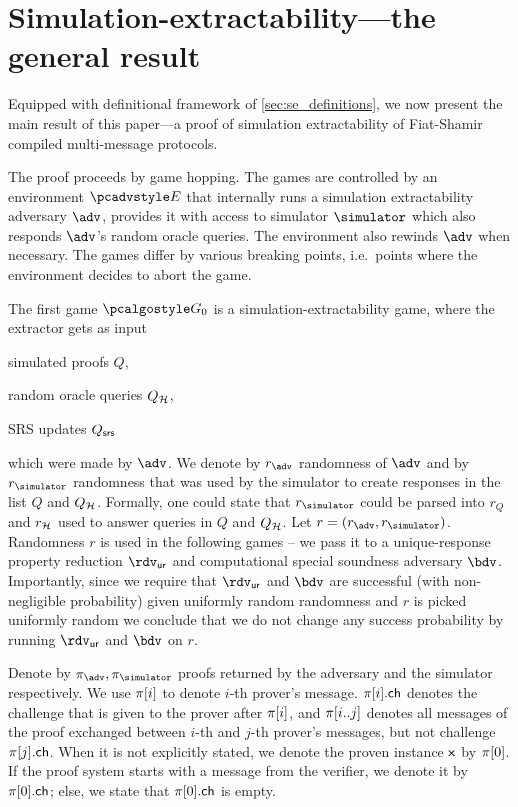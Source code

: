 \section{Simulation-extractability---the general result}
\label{sec:general}
Equipped with definitional framework of \cref{sec:se_definitions}, we now present the
main result of this paper---a proof of simulation extractability of
Fiat-Shamir compiled multi-message protocols.

The proof proceeds by game hopping. The games are controlled by an environment $\env$ that
internally runs a simulation extractability adversary $\advse$, provides it with access to
simulator $\simulator$ which also responds $\adv$'s random oracle queries. The environment
also rewinds $\adv$ when necessary. The games differ by various breaking points,
i.e.~points where the environment decides to abort the game.

The first game $\game{0}$ is a simulation-extractability game, where the extractor
gets as input
\begin{inparaenum}[(1)]
\item simulated proofs $Q$,
\item random oracle queries $Q_{\mathcal{H}}$,
\item SRS updates $Q_{\mathsf{srs}}$
\end{inparaenum}
which were made by $\advse$.  We denote by $\radv$ randomness of $\advse$ and by
$\rsim$ randomness that was used by the simulator to create responses in the list $Q$
and $Q_{\mathcal{H}}$. Formally, one could state that $\rsim$ could be parsed into $r_Q$ and
$r_{\mathcal{H}}$ used to answer queries in $Q$ and $Q_{\mathcal{H}}$. Let $r = (\radv,
\rsim)$. Randomness $r$ is used in the following games -- we pass it to a
unique-response property reduction $\rdvur$ and computational special soundness adversary
$\bdv$. Importantly, since we require that $\rdvur$ and $\bdv$ are successful (with
non-negligible probability) given uniformly random randomness and $r$ is picked
uniformly random we conclude that we do not change any success probability by running
$\rdvur$ and $\bdv$ on $r$. 

Denote by $\zkproof_{\advse}, \zkproof_{\simulator}$ proofs returned by the adversary
and the simulator respectively. We use $\pi[i]$ to denote $i$-th prover's
message. $\pi[i].\mathsf{ch}$ denotes the challenge that is given to the prover after
$\pi[i]$, and $\pi[i..j]$ denotes all messages of the proof exchanged
between $i$-th and $j$-th prover's messages, but not challenge
$\pi[j].\mathsf{ch}$. When it is not explicitly stated, we denote the proven instance
$\mathsf{x}$ by $\pi[0]$. If the proof system starts with a message from the verifier,
we denote it by $\pi[0].\mathsf{ch}$; else, we state that $\pi[0].\mathsf{ch}$ is empty.

